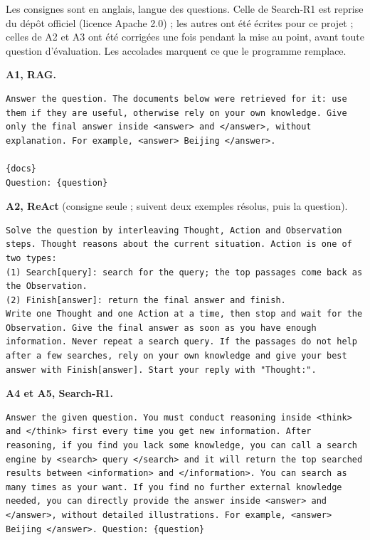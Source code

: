 Les consignes sont en anglais, langue des questions. Celle de Search-R1 est reprise du dépôt officiel (licence Apache 2.0) ; les autres ont été écrites pour ce projet ; celles de A2 et A3 ont été corrigées une fois pendant la mise au point, avant toute question d'évaluation. Les accolades marquent ce que le programme remplace.

\noindent\textbf{A1, RAG.}
\begin{Verbatim}[breaklines, fontsize=\footnotesize, frame=single]
Answer the question. The documents below were retrieved for it: use them if they are useful, otherwise rely on your own knowledge. Give only the final answer inside <answer> and </answer>, without explanation. For example, <answer> Beijing </answer>.

{docs}
Question: {question}
\end{Verbatim}

\noindent\textbf{A2, ReAct} (consigne seule ; suivent deux exemples résolus, puis la question).
\begin{Verbatim}[breaklines, fontsize=\footnotesize, frame=single]
Solve the question by interleaving Thought, Action and Observation steps. Thought reasons about the current situation. Action is one of two types:
(1) Search[query]: search for the query; the top passages come back as the Observation.
(2) Finish[answer]: return the final answer and finish.
Write one Thought and one Action at a time, then stop and wait for the Observation. Give the final answer as soon as you have enough information. Never repeat a search query. If the passages do not help after a few searches, rely on your own knowledge and give your best answer with Finish[answer]. Start your reply with "Thought:".
\end{Verbatim}

\noindent\textbf{A4 et A5, Search-R1.}
\begin{Verbatim}[breaklines, fontsize=\footnotesize, frame=single]
Answer the given question. You must conduct reasoning inside <think> and </think> first every time you get new information. After reasoning, if you find you lack some knowledge, you can call a search engine by <search> query </search> and it will return the top searched results between <information> and </information>. You can search as many times as your want. If you find no further external knowledge needed, you can directly provide the answer inside <answer> and </answer>, without detailed illustrations. For example, <answer> Beijing </answer>. Question: {question}
\end{Verbatim}

